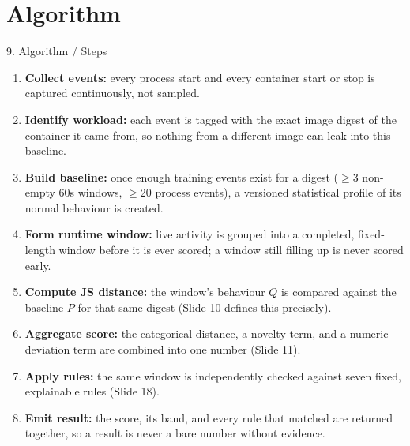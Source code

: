 \documentclass[aspectratio=169, 11pt]{beamer}
\begin{document}
\section{Algorithm}
\begin{frame}{9. Algorithm / Steps}
    \footnotesize
    \begin{enumerate}\setlength{\itemsep}{5pt}
        \item \textbf{Collect events:} every process start and every container start or stop is captured continuously, not sampled.
        \item \textbf{Identify workload:} each event is tagged with the exact image digest of the container it came from, so nothing from a different image can leak into this baseline.
        \item \textbf{Build baseline:} once enough training events exist for a digest ($\geq$3 non-empty 60s windows, $\geq$20 process events), a versioned statistical profile of its normal behaviour is created.
        \item \textbf{Form runtime window:} live activity is grouped into a completed, fixed-length window before it is ever scored; a window still filling up is never scored early.
        \item \textbf{Compute JS distance:} the window's behaviour $Q$ is compared against the baseline $P$ for that same digest (Slide 10 defines this precisely).
        \item \textbf{Aggregate score:} the categorical distance, a novelty term, and a numeric-deviation term are combined into one number (Slide 11).
        \item \textbf{Apply rules:} the same window is independently checked against seven fixed, explainable rules (Slide 18).
        \item \textbf{Emit result:} the score, its band, and every rule that matched are returned together, so a result is never a bare number without evidence.
    \end{enumerate}
\end{frame}
\end{document}

